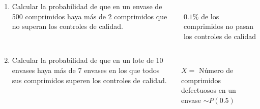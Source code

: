 \documentclass[aspectratio=149,10pt,xcolor=dvipsnames,t]{beamer}
\begin{document}
\begin{frame}
\begin{columns}
\begin{column}[T]{0.6\textwidth}
\begin{enumerate}
\item Calcular la probabilidad de que en un envase de 500 comprimidos haya más de 2 comprimidos que no superan los controles de calidad.
\end{enumerate}
\end{column}
\begin{column}[T]{0.4\textwidth}
\\
$0.1\%$ de los comprimidos no pasan los controles de calidad
\end{column}
\end{columns}
\end{frame}


\begin{frame}
\begin{columns}
\begin{column}[T]{0.6\textwidth}
\begin{enumerate}
\setcounter{enumi}{1}
\item Calcular la probabilidad de que en un lote de 10 envases haya más de 7 envases en los que todos sus comprimidos superen los controles de calidad.
\end{enumerate}
\end{column}
\begin{column}[T]{0.4\textwidth}
\\
$X=$ Número de comprimidos defectuosos en un envase $\sim P(0.5)$\\
\end{column}
\end{columns}
\end{frame}
\end{document}
